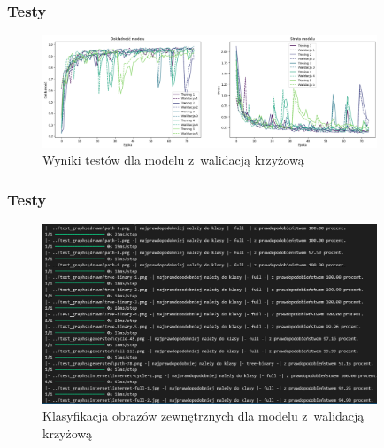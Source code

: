 \begin{frame}
    \frametitle{Testy}

    \begin{figure}[ht]
        \centering
        \includegraphics[width=10cm]{../thesis/resources/tests/images/v3/crossvalid_img.png}
        \caption{Wyniki testów dla modelu z~walidacją krzyżową}
    \end{figure}
    
\end{frame}

\begin{frame}
    \frametitle{Testy}

    \begin{figure}[ht]
        \centering
        \includegraphics[width=10cm]{../thesis/resources/tests/images/v3/crossvalid_txt.png}
        \caption{Klasyfikacja obrazów zewnętrznych dla modelu z~walidacją krzyżową}
    \end{figure}

\end{frame}

